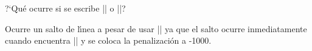 


\bigskip

\enunciadoS ?`Qu\'e ocurre si se escribe |\nobreak\break| o
|\break\nobreak|?

\bigskip

\respuestaS Ocurre un salto de l\'{\i}nea a pesar de usar |\nobreak|
ya que el salto ocurre inmediatamente cuando encuentra |\break| y se
coloca la penalizaci\'on a -1000.

\bye

